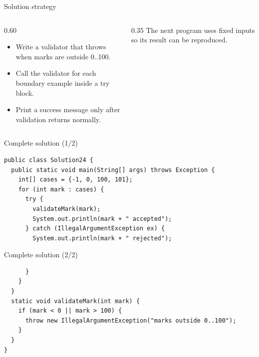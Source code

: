 \documentclass[10pt,aspectratio=169]{beamer}
\begin{document}
\begin{frame}[fragile,t]{Solution strategy}
\begin{columns}[T,onlytextwidth]\begin{column}{0.60\textwidth}
\begin{itemize}
\item Write a validator that throws when marks are outside 0..100.
\item Call the validator for each boundary example inside a try block.
\item Print a success message only after validation returns normally.
\end{itemize}
\end{column}\begin{column}{0.35\textwidth}\small
The next program uses fixed inputs so its result can be reproduced.
\end{column}\end{columns}
\end{frame}

\begin{frame}[fragile,t]{Complete solution (1/2)}
\begin{lstlisting}
public class Solution24 {
  public static void main(String[] args) throws Exception {
    int[] cases = {-1, 0, 100, 101};
    for (int mark : cases) {
      try {
        validateMark(mark);
        System.out.println(mark + " accepted");
      } catch (IllegalArgumentException ex) {
        System.out.println(mark + " rejected");
\end{lstlisting}
\end{frame}

\begin{frame}[fragile,t]{Complete solution (2/2)}
\begin{lstlisting}
      }
    }
  }
  static void validateMark(int mark) {
    if (mark < 0 || mark > 100) {
      throw new IllegalArgumentException("marks outside 0..100");
    }
  }
}
\end{lstlisting}
\end{frame}
\end{document}
